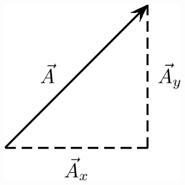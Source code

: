     \setcounter{subfigure}{0}


	\begin{figure}[H] %
    \begin{center}
    \label{m38819*id192986!!!underscore!!!media}\label{m38819*id192986!!!underscore!!!printimage}\includegraphics[width=300px]{col11305.imgs/m38819_PG11C1_059.png} %
        
      \vspace{2pt}
    \vspace{.1in}
    
    \end{center}

 \end{figure}   

    \addtocounter{footnote}{-0}
    
      \par 
\label{m38819*secfhsst!!!underscore!!!id1989}\vspace{.5cm} 
      
